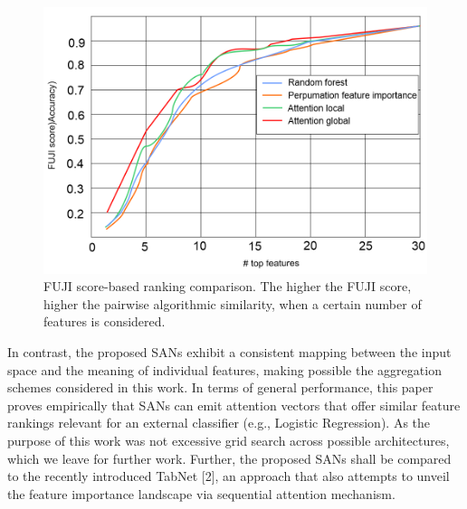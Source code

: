 \begin{figure}
    \centering
	\includegraphics[scale=0.7]{images/fuji_score.png}
	\caption{FUJI score-based ranking comparison. The higher the FUJI score, higher the pairwise algorithmic similarity, when a certain number of features is considered.}
    \label{fig:fuji_score}
\end{figure}

 In contrast, the proposed SANs exhibit a consistent
mapping between the input space and the meaning of individual features, making possible the aggregation schemes considered in this
work.
In terms of general performance, this paper proves empirically that
SANs can emit attention vectors that offer similar feature rankings
relevant for an external classifier (e.g., Logistic Regression). As the
purpose of this work was not excessive grid search across possible
architectures, which we leave for further work. Further, the proposed SANs
shall be compared to the recently introduced TabNet [2], an approach
that also attempts to unveil the feature importance landscape via sequential attention mechanism.

